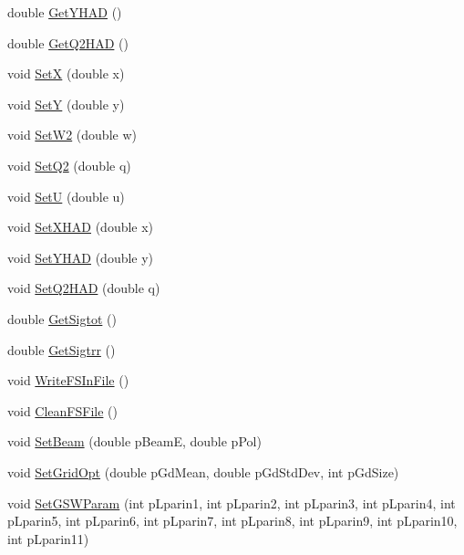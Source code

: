 \begin{DoxyCompactItemize}
\item 
double \hyperlink{class_t_djangoh_a4cfb37ad76ec038f6e05b90341befb7f}{Get\+Y\+H\+AD} ()
\item 
double \hyperlink{class_t_djangoh_a969e748da53637a3732a27cfe23a34d2}{Get\+Q2\+H\+AD} ()
\item 
void \hyperlink{class_t_djangoh_a1ef3828a15dfd67a5e5c902bd584fd8b}{SetX} (double x)
\item 
void \hyperlink{class_t_djangoh_a91061fe2a386a9ddb7c7398c9443fa74}{SetY} (double y)
\item 
void \hyperlink{class_t_djangoh_aea9a499dfc8cbca480f228b79a05d99a}{Set\+W2} (double w)
\item 
void \hyperlink{class_t_djangoh_abecf2835ceecd72f0847544b72fd837e}{Set\+Q2} (double q)
\item 
void \hyperlink{class_t_djangoh_a69cebdc5dc26bfd0def872a996da0650}{SetU} (double u)
\item 
void \hyperlink{class_t_djangoh_a13173ef3490a98d8488ce7421905284c}{Set\+X\+H\+AD} (double x)
\item 
void \hyperlink{class_t_djangoh_a2dc4b62cd66dd41e8ae3d62965e36617}{Set\+Y\+H\+AD} (double y)
\item 
void \hyperlink{class_t_djangoh_a0066b103b2f779d8ed302fd77f42ee5e}{Set\+Q2\+H\+AD} (double q)
\item 
double \hyperlink{class_t_djangoh_a6c3ac520ed9c8c8eb0e80f3dda7eb146}{Get\+Sigtot} ()
\item 
double \hyperlink{class_t_djangoh_af888193a486499c7b019b0da80eae760}{Get\+Sigtrr} ()
\item 
void \hyperlink{class_t_djangoh_aa78f3a43ed71499a9efe9e87cc22d668}{Write\+F\+S\+In\+File} ()
\item 
void \hyperlink{class_t_djangoh_ade1e9ff8b29d2b95d24a22c3474a7ba6}{Clean\+F\+S\+File} ()
\item 
void \hyperlink{class_t_djangoh_a6995df5cd413a9e998fe8c0836004363}{Set\+Beam} (double p\+BeamE, double p\+Pol)
\item 
void \hyperlink{class_t_djangoh_ae1c46a20056315d4c43c8a4f72eb2f19}{Set\+Grid\+Opt} (double p\+Gd\+Mean, double p\+Gd\+Std\+Dev, int p\+Gd\+Size)
\item 
void \hyperlink{class_t_djangoh_a87690d78d0b95de8851a5a801cc172e5}{Set\+G\+S\+W\+Param} (int p\+Lparin1, int p\+Lparin2, int p\+Lparin3, int p\+Lparin4, int p\+Lparin5, int p\+Lparin6, int p\+Lparin7, int p\+Lparin8, int p\+Lparin9, int p\+Lparin10, int p\+Lparin11)
\item 

\end{DoxyCompactItemize}

